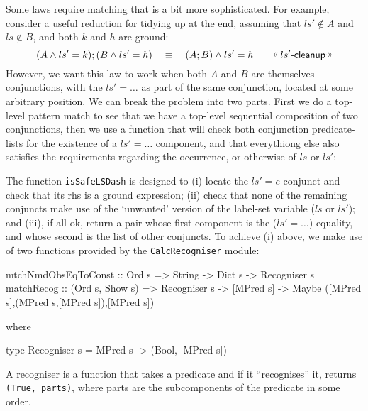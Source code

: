 Some laws require matching that is a bit more sophisticated.
For example,
consider a useful reduction for tidying up at the end,
assuming that $ls' \notin A$ and $ls \notin B$, and both $k$ and $h$
are ground:
\[
   (A \land ls'=k) ; (B \land ls'= h)
   \quad\equiv\quad
   (A;B) \land ls'=h
   \qquad \elabel{$ls'$-cleanup}
\]
However, we want this law to work when both $A$
and $B$ are themselves conjunctions, with the $ls'=\dots$
as part of the same conjunction, located at some arbitrary position.
We can break the problem into two parts.
First we do a top-level pattern match
to see that we have a top-level sequential composition
of two conjunctions,
then we use a function that will check both conjunction predicate-lists
for the existence of a $ls'=\dots$ component,
and that everythiong else also satisfies the requirements regarding
the occurrence, or otherwise of $ls$ or $ls'$:
The function \texttt{isSafeLSDash}
is designed to
(i) locate the $ls'=e$ conjunct and check that its rhs is a ground expression;
(ii) check that none of the remaining conjuncts make use of the
`unwanted' version of the label-set variable ($ls$ or $ls'$);
and (iii), if all ok, return a pair
whose first component is the ($ls'=\dots$) equality,
and whose second is the list of other conjuncts.
To achieve (i) above,
we make use of two functions provided by the \texttt{CalcRecogniser} module:
\begin{code}
mtchNmdObsEqToConst :: Ord s => String -> Dict s -> Recogniser s
matchRecog :: (Ord s, Show s)
           => Recogniser s -> [MPred s]
           -> Maybe ([MPred s],(MPred s,[MPred s]),[MPred s])
\end{code}
where
\begin{code}
type Recogniser s = MPred s -> (Bool, [MPred s])
\end{code}
A recogniser is a function that takes a predicate
and if it ``recognises'' it, returns \texttt{(True, parts)},
where parts are the subcomponents of the predicate in some order.
